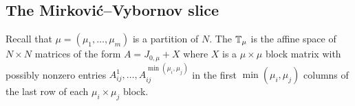\documentclass[draft]{article} %
\begin{document}
\subsection{The Mirkovi\'c--Vybornov slice}
\label{ss:mvyslice} 
% 
% 
Recall that $\mu=(\mu_1,\dots,\mu_m)$ is a partition of $N$. The  $\mathbb T_\mu$ is the affine space of $N\times N$ matrices of the form
% 
% 
$A = J_{0,\mu} + X$ where $X$ is a $\mu\times\mu$ block matrix with possibly nonzero entries $A_{ij}^1,\dots,A_{ij}^{\min(\mu_i,\mu_j)}$ in the first $\min(\mu_i,\mu_j)$ columns of the last row of each $\mu_i\times\mu_j$ block. 
\end{document}
